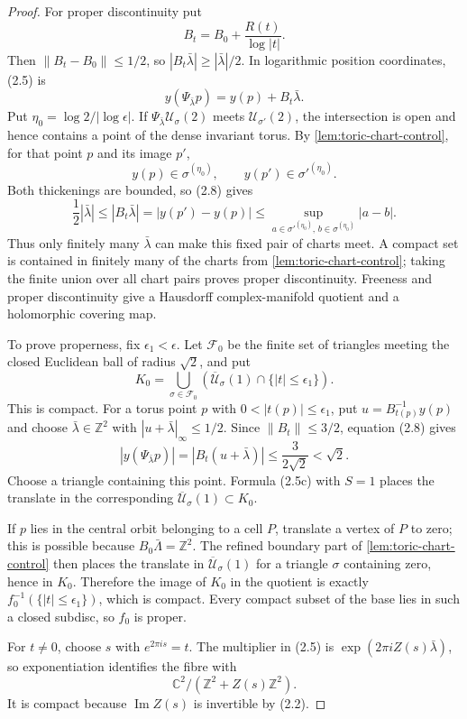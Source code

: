 \begin{proof}
For proper discontinuity put
\[
 B_t=B_0+\frac{R(t)}{\log|t|}.
\]
Then \(\|B_t-B_0\|\le1/2\), so
\(|B_t\bar\lambda|\ge|\bar\lambda|/2\).  In logarithmic position
coordinates, (2.5) is
\[
 y(\Psi_{\bar\lambda}p)=y(p)+B_t\bar\lambda.
\tag{2.8}
\]
Put \(\eta_0=\log2/|\log\epsilon|\).  If
\(\Psi_{\bar\lambda}\mathcal U_\sigma(2)\) meets
\(\mathcal U_{\sigma'}(2)\), the intersection is open and hence contains a
point of the dense invariant torus.  By \cref{lem:toric-chart-control}, for
that point \(p\) and its image \(p'\),
\[
 y(p)\in\sigma^{(\eta_0)},\qquad
 y(p')\in{\sigma'}^{(\eta_0)}.
\]
Both thickenings are bounded, so (2.8) gives
\[
 \frac12|\bar\lambda|
 \le |B_t\bar\lambda|
 =|y(p')-y(p)|
 \le \sup_{a\in{\sigma'}^{(\eta_0)},\,b\in\sigma^{(\eta_0)}}|a-b|.
\]
Thus only finitely many \(\bar\lambda\) can make this fixed pair of charts
meet.  A compact set is contained in finitely many of the charts from
\cref{lem:toric-chart-control}; taking the finite union over all chart pairs
proves proper discontinuity.  Freeness and proper discontinuity give a
Hausdorff complex-manifold quotient and a holomorphic covering map.

To prove properness, fix \(\epsilon_1<\epsilon\).  Let \(\mathcal F_0\) be
the finite set of triangles meeting the closed Euclidean ball of radius
\(\sqrt2\), and put
\[
 K_0=\bigcup_{\sigma\in\mathcal F_0}
 \left(\overline{\mathcal U}_\sigma(1)
 \cap\{|t|\le\epsilon_1\}\right).
\]
This is compact.  For a torus point \(p\) with
\(0<|t(p)|\le\epsilon_1\), put \(u=B_{t(p)}^{-1}y(p)\) and choose
\(\bar\lambda\in\mathbb Z^2\) with
\(|u+\bar\lambda|_\infty\le1/2\).  Since
\(\|B_t\|\le3/2\), equation (2.8) gives
\[
 |y(\Psi_{\bar\lambda}p)|
 =|B_t(u+\bar\lambda)|
 \le\frac{3}{2\sqrt2}<\sqrt2.
\]
Choose a triangle containing this point.  Formula (2.5c) with \(S=1\)
places the translate in the corresponding
\(\overline{\mathcal U}_\sigma(1)\subset K_0\).

If \(p\) lies in the central orbit belonging to a cell \(P\), translate a
vertex of \(P\) to zero; this is possible because
\(B_0\bar\Lambda=\mathbb Z^2\).  The refined boundary part of
\cref{lem:toric-chart-control} then places the translate in
\(\overline{\mathcal U}_\sigma(1)\) for a triangle \(\sigma\) containing
zero, hence in \(K_0\).  Therefore the image of \(K_0\) in the quotient is
exactly \(f_0^{-1}(\{|t|\le\epsilon_1\})\), which is compact.  Every compact
subset of the base lies in such a closed subdisc, so \(f_0\) is proper.

For \(t\ne0\), choose \(s\) with \(e^{2\pi is}=t\).  The multiplier in
(2.5) is \(\exp(2\pi iZ(s)\bar\lambda)\), so exponentiation identifies the
fibre with
\[
 \mathbb C^2/(\mathbb Z^2+Z(s)\mathbb Z^2).
\]
It is compact because \(\operatorname{Im}Z(s)\) is invertible by (2.2).


\end{proof}
